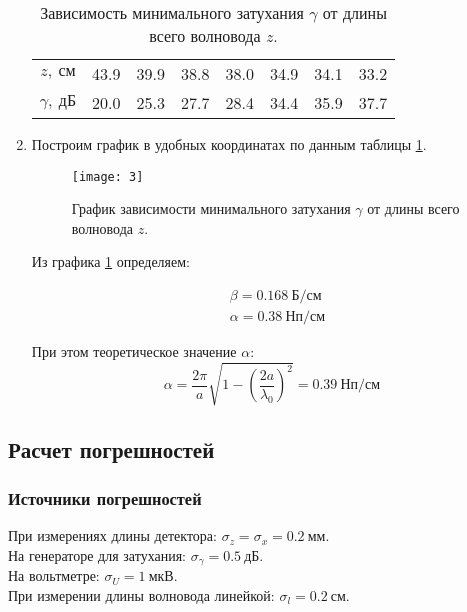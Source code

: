 \documentclass{lab}
\begin{document}
\begin{enumerate}
\begin{table}[H]
	\centering
	\begin{tabular}{|c|ccccccc|}
		\hline
		$ z,~см $		&43.9	&39.9	&38.8	&38.0	&34.9	&34.1	&33.2	\\
		$ \gamma,~дБ $	&20.0	&25.3	&27.7	&28.4	&34.4	&35.9	&37.7	\\ \hline
	\end{tabular}
	\caption{\footnotesize 
		Зависимость минимального затухания $ \gamma $ от длины всего волновода $ z $.
	}
	\label{tab3}
\end{table}

\item Построим график в удобных координатах по данным таблицы \ref{tab3}.

\begin{figure}[H]
	\centering
	\texttt{[image: 3]}
	\caption{\footnotesize
		График зависимости минимального затухания $ \gamma $ от длины всего волновода $ z $.
	}
	\label{graph3}
\end{figure}

Из графика \ref{graph3} определяем:

\begin{equation}
\begin{aligned}
&\beta = 0.168~Б/см\\
&\alpha = 0.38~Нп/см
\end{aligned}
\end{equation}

При этом теоретическое значение $ \alpha $:
$$ \alpha = \dfrac{2\pi}{a}\sqrt{1-\left(\dfrac{2a}{\lambda_0}\right)^2} = 0.39~Нп/см $$

\end{enumerate}

\newpage

\subsection*{Расчет погрешностей}
\subsubsection*{Источники погрешностей}

При измерениях длины детектора: $ \sigma_z = \sigma_x = 0.2~мм $.\\
На генераторе для затухания: $ \sigma_{\gamma} = 0.5~дБ $.\\
На вольтметре: $ \sigma_U = 1~мкВ $.\\
При измерении длины волновода линейкой: $ \sigma_l = 0.2~см $.
\end{document}
